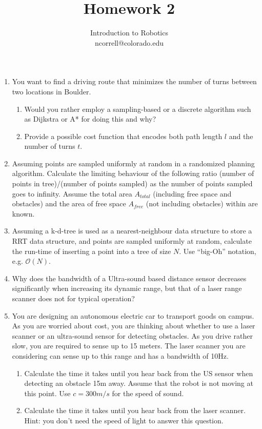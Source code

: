 \documentclass[letter,twoside,11pt]{article}
\begin{document}
\vspace{-50px}
\title{Homework 2}
\author{Introduction to Robotics\\
ncorrell@colorado.edu}
\date{} %
\maketitle

\begin{enumerate}
\item You want to find a driving route that minimizes the number of turns between two locations in Boulder.
\begin{enumerate}
\item Would you rather employ a sampling-based or a discrete algorithm such as Dijkstra or A* for doing this and why?  
\item Provide a possible cost function that encodes both path length $l$ and the number of turns $t$.
\end{enumerate}
\item Assuming points are sampled uniformly at random in a randomized planning algorithm. Calculate the limiting behaviour of the following ratio   (number of points in tree)/(number of points sampled) as the number of points sampled goes to infinity. Assume the total area $A_{total}$ (including free space and obstacles) and the area of free space $A_{free}$ (not including obstacles) within are known.  

\item Assuming a k-d-tree is used as a nearest-neighbour data structure to store a RRT data structure, and points are sampled uniformly at random, calculate the  run-time of inserting a point into a tree of size $N$. Use ``big-Oh'' notation, e.g. $\mathcal{O}(N)$.

\item Why does the bandwidth of a Ultra-sound based distance sensor decreases significantly when increasing its dynamic range, but that of a laser range scanner does not for typical operation?

\item You are designing an autonomous electric car to transport goods on campus. As you are worried about cost, you are thinking about whether to use a laser scanner or an ultra-sound sensor for detecting obstacles. As you drive rather slow, you are required to sense up to 15 meters. The laser scanner you are considering can sense up to this range and has a bandwidth of 10Hz. 
\begin{enumerate}
\item Calculate the time it takes until you hear back from the US sensor when detecting an obstacle 15m away. Assume that the robot is not moving at this point. Use $c=300m/s$ for the speed of sound. 
\item Calculate the time it takes until you hear back from the laser scanner. Hint: you don't need the speed of light to answer this question.     
\end{enumerate}


\end{enumerate}
\end{document}
